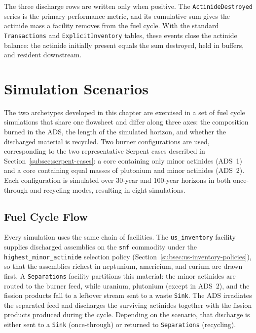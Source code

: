 The three discharge rows are written only when positive. The
\texttt{ActinideDestroyed} series is the primary performance metric, and its
cumulative sum gives the actinide mass a facility removes from the fuel cycle. With
the standard \Cyclus \texttt{Transactions} and \texttt{ExplicitInventory} tables,
these events close the actinide balance: the actinide initially present equals the
sum destroyed, held in buffers, and resident downstream.


\section{Simulation Scenarios}
\label{sec:simulation-scenarios}

The two archetypes developed in this chapter are exercised in a set of
fuel cycle simulations that share one flowsheet and differ along three axes: the
composition burned in the \gls{ADS}, the length of the simulated horizon, and
whether the discharged material is recycled. Two burner configurations are used,
corresponding to the two representative Serpent cases described in
Section~\ref{subsec:serpent-cases}: a core containing only minor actinides
(ADS~1) and a core containing equal masses of plutonium and minor actinides
(ADS~2). Each configuration is simulated over 30-year and 100-year horizons in
both once-through and recycling modes, resulting in eight simulations.

\subsection{Fuel Cycle Flow}
\label{subsec:scenario-flowsheet}

Every simulation uses the same chain of facilities. The \texttt{us\_inventory}
facility supplies discharged assemblies on the \texttt{snf} commodity under the
\texttt{highest\_minor\_actinide} selection policy
(Section~\ref{subsec:us-inventory-policies}), so that the assemblies richest in
neptunium, americium, and curium are drawn first. A \Cycamore
\texttt{Separations} facility partitions this material: the minor actinides are
routed to the burner feed, while uranium, plutonium (except in ADS~2), and the
fission products fall to a leftover stream sent to a waste \texttt{Sink}. The
\gls{ADS} irradiates the separated feed and discharges the surviving actinides
together with the fission products produced during the cycle. Depending on the
scenario, that discharge is either sent to a \texttt{Sink} (once-through) or
returned to \texttt{Separations} (recycling).

